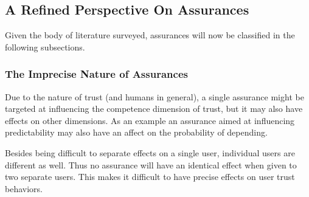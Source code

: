 \subsection{A Refined Perspective On Assurances} \label{sec:assurances_refined}
Given the body of literature surveyed, assurances will now be classified in the following subsections.





\subsubsection{The Imprecise Nature of Assurances}\label{sec:imprecise}
    Due to the nature of trust (and humans in general), a single assurance might be targeted at influencing the competence dimension of trust, but it may also have effects on other dimensions. As an example an assurance aimed at influencing predictability may also have an affect on the probability of depending.

    Besides being difficult to separate effects on a single user, individual users are different as well. Thus no assurance will have an identical effect when given to two separate users. This makes it difficult to have precise effects on user trust behaviors.
